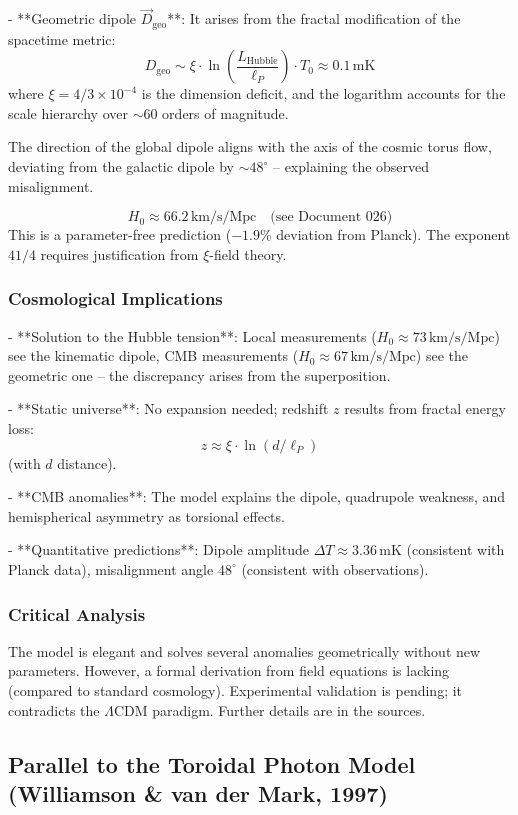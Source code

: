 - **Geometric dipole $\vec{D}_{\text{geo}}$**:
It arises from the fractal modification of the spacetime metric:
\[
D_{\text{geo}} \sim \xi \cdot \ln\left(\frac{L_{\text{Hubble}}}{\ell_P}\right) \cdot T_0 \approx 0.1\,\text{mK}
\]
where $\xi = 4/3 \times 10^{-4}$ is the dimension deficit, and the logarithm accounts for the scale hierarchy over $\sim 60$ orders of magnitude.

The direction of the global dipole aligns with the axis of the cosmic torus flow, deviating from the galactic dipole by $\sim 48^\circ$ – explaining the observed misalignment.

\[
H_0 \approx 66.2\,\text{km/s/Mpc} \quad \text{(see Document~026)}
\]
This is a parameter-free prediction ($-1.9\%$ deviation from Planck). The exponent $41/4$ requires justification from $\xi$-field theory.

\subsubsection{Cosmological Implications}

- **Solution to the Hubble tension**: Local measurements ($H_0 \approx 73\,\text{km/s/Mpc}$) see the kinematic dipole, CMB measurements ($H_0 \approx 67\,\text{km/s/Mpc}$) see the geometric one – the discrepancy arises from the superposition.

- **Static universe**: No expansion needed; redshift $z$ results from fractal energy loss:
\[
z \approx \xi \cdot \ln(d / \ell_P)
\]
(with $d$ distance).

- **CMB anomalies**: The model explains the dipole, quadrupole weakness, and hemispherical asymmetry as torsional effects.

- **Quantitative predictions**: Dipole amplitude $\Delta T \approx 3.36\,\text{mK}$ (consistent with Planck data), misalignment angle $48^\circ$ (consistent with observations).

\subsubsection{Critical Analysis}

The model is elegant and solves several anomalies geometrically without new parameters. However, a formal derivation from field equations is lacking (compared to standard cosmology). Experimental validation is pending; it contradicts the $\Lambda$CDM paradigm. Further details are in the sources.

\subsection{Parallel to the Toroidal Photon Model (Williamson \& van der Mark, 1997)}

